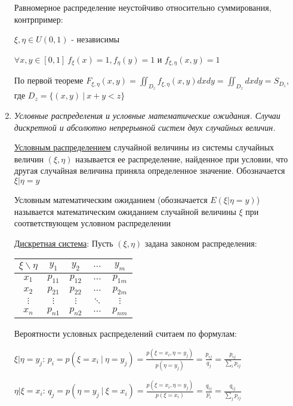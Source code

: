 \begin{enumerate}
     Равномерное распределение неустойчиво относительно суммирования, контрпример:

    $\xi, \eta \in U(0, 1)$ - независимы

    $\forall x, y \in [0, 1] \ f_{\xi}(x) = 1, f_\eta(y) = 1$ и $f_{\xi, \eta}(x, y) = 1$

    По первой теореме $F_{\xi, \eta}(x, y) = \iint_{D_z} f_{\xi, \eta}(x, y) dxdy = \iint_{D_z} dxdy = S_{D_z}$, где $D_z = \{(x, y) \ | \ x + y < z\}$

    \item \textit{Условные распределения и условные математические ожидания. Случаи дискретной и абсолютно непрерывной систем двух случайных величин.}

    \hyperlink{conditionaldistribution}{Условным распределением} случайной величины из системы случайных величин $(\xi, \eta)$ 
    называется ее распределение, найденное при условии, что другая случайная величина приняла 
    определенное значение. Обозначается $\xi | \eta = y$

    Условным математическим ожиданием (обозначается $E(\xi | \eta = y)$) называется 
    математическим ожиданием случайной величины $\xi$ при соответствующем условном распределении
 
    \hyperlink{conditionaldistributionindiscretesystem}{Дискретная система}: 
    Пусть $(\xi, \eta)$ задана законом распределения:

    \begin{tabular}{c|c|c|c|c}
        $\xi \backslash \eta$ & $y_1$ & $y_2$ & $\dots$ & $y_m$ \\
        \hline
        $x_1$ & $p_{11}$ & $p_{12}$ & $\dots$ & $p_{1m}$ \\
        \hline
        $x_2$ & $p_{21}$ & $p_{22}$ & $\dots$ & $p_{2m}$ \\
        \hline
        $\vdots$ & $\vdots$ & $\vdots$ & $\ddots$ & $\vdots$ \\
        \hline
        $x_n$ & $p_{n1}$ & $p_{n2}$ & $\dots$ & $p_{nm}$ \\
    \end{tabular}

    Вероятности условных распределений считаем по формулам:

    $\xi | \eta = y_j$: $p_i = p(\xi = x_i \ | \ \eta = y_j) = \frac{p(\xi = x_i, \eta = y_j)}{p(\eta = y_j)} = \frac{p_{ij}}{q_j} = \frac{p_{ij}}{\sum_i p_{ij}}$

    $\eta | \xi = x_i$: $q_j = p(\eta = y_j \ | \ \xi = x_i) = \frac{p(\xi = x_i, \eta = y_j)}{p(\xi = x_i)} = \frac{q_{ij}}{p_i} = \frac{q_{ij}}{\sum_j p_{ij}}$


\end{enumerate}
